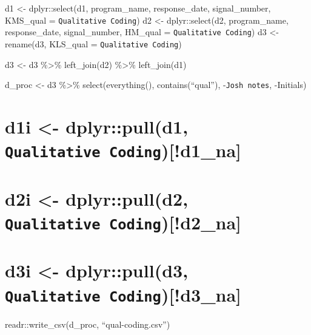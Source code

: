 \documentclass[]{msu-thesis}
\theoremstyle{definition}
\theoremstyle{definition}
\theoremstyle{definition}
\theoremstyle{remark}
\begin{document}
d1 \textless{}- dplyr::select(d1, program\_name, response\_date,
signal\_number, KMS\_qual = \texttt{Qualitative\ Coding}) d2
\textless{}- dplyr::select(d2, program\_name, response\_date,
signal\_number, HM\_qual = \texttt{Qualitative\ Coding}) d3 \textless{}-
rename(d3, KLS\_qual = \texttt{Qualitative\ Coding})

d3 \textless{}- d3 \%\textgreater{}\% left\_join(d2) \%\textgreater{}\%
left\_join(d1)

d\_proc \textless{}- d3 \%\textgreater{}\% select(everything(),
contains(``qual''), -\texttt{Josh\ notes}, -Initials)

\chapter{\texorpdfstring{d1i \textless{}- dplyr::pull(d1,
\texttt{Qualitative\ Coding}){[}!d1\_na{]}}{d1i \textless{}- dplyr::pull(d1, Qualitative Coding){[}!d1\_na{]}}}\label{d1i---dplyrpulld1-qualitative-codingd1_na}

\chapter{\texorpdfstring{d2i \textless{}- dplyr::pull(d2,
\texttt{Qualitative\ Coding}){[}!d2\_na{]}}{d2i \textless{}- dplyr::pull(d2, Qualitative Coding){[}!d2\_na{]}}}\label{d2i---dplyrpulld2-qualitative-codingd2_na}

\chapter{\texorpdfstring{d3i \textless{}- dplyr::pull(d3,
\texttt{Qualitative\ Coding}){[}!d3\_na{]}}{d3i \textless{}- dplyr::pull(d3, Qualitative Coding){[}!d3\_na{]}}}\label{d3i---dplyrpulld3-qualitative-codingd3_na}

readr::write\_csv(d\_proc, ``qual-coding.csv'')
\end{document}
